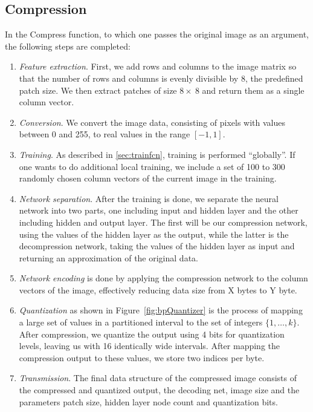 \subsection{Compression} \label{sec:compress}
In the Compress function, to which one passes the original image as an argument, the following steps are completed:
\begin{enumerate}
\item \emph{Feature extraction}. First, we add rows and columns to the image matrix so that the number of rows and columns is evenly divisible by 8, the predefined patch size. We then extract patches of size \(8 \times~8\) and return them as a single column vector.

\item \emph{Conversion}. We convert the image data, consisting of pixels with values between 0 and 255, to real values in the range \([-1, 1]\). 

\item \emph{Training}. As described in \ref{sec:trainfcn}, training is performed ``globally''. If one wants to do additional local training, we include a set of 100 to 300 randomly chosen column vectors of the current image in the training.

\item \emph{Network separation}. After the training is done, we separate the neural network into two parts, one including input and hidden layer and the other including hidden and output layer. The first will be our compression network, using the values of the hidden layer as the output, while the latter is the decompression network, taking the values of the hidden layer as input and returning an approximation of the original data.

\item \emph{Network encoding} is done by applying the compression network to the column vectors of the image, effectively reducing data size from {\color{red} X bytes to Y byte}.

\item \emph{Quantization} as shown in Figure~\ref{fig:bpQuantizer} is the process of mapping a large set of values in a partitioned interval to the set of integers \(\{1,\dots,k\}\). After compression, we quantize the output using 4 bits for quantization levels, leaving us with 16 identically wide intervals. After mapping the compression output to these values, we store two indices per byte.

\item \emph{Transmission}. The final data structure of the compressed image consists of the compressed and quantized output, the decoding net, image size and the parameters patch size, hidden layer node count and quantization bits.
\end{enumerate}

